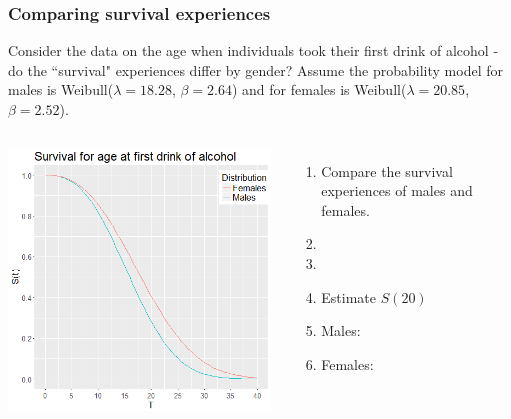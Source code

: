 \begin{frame}
\frametitle{Comparing survival experiences}
Consider the data on the age when individuals took their first drink of alcohol - do the ``survival" experiences differ by gender?  Assume the probability model for males is Weibull($\lambda=18.28$, $\beta=2.64$) and for females is Weibull($\lambda=20.85$, $\beta=2.52$).
\vskip3pt
\begin{columns}
\includegraphics[width=0.98\textwidth]{Figures/drink_surv_weib.png}
\begin{enumerate}
\item Compare the survival experiences of males and females.
\item[] %
\item[] %
\item Estimate $S(20)$
\item[] Males: %
\item[] Females:  %
\end{enumerate}
\end{columns}
\end{frame}

